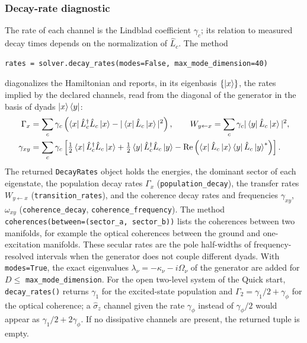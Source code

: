 \documentclass[11pt]{article}
\begin{document}
\subsubsection{Decay-rate diagnostic}

The rate of each channel is the Lindblad coefficient $\gamma_c$; its relation to measured decay times depends on the normalization of $\hat{L}_c$. The method
\begin{verbatim}
rates = solver.decay_rates(modes=False, max_mode_dimension=40)
\end{verbatim}
diagonalizes the Hamiltonian and reports, in its eigenbasis $\{\ket{x}\}$, the rates implied by the declared channels, read from the diagonal of the generator in the basis of dyads $\ket{x}\bra{y}$:
\begin{align}
    \Gamma_x&=\sum_c\gamma_c\left(\bra{x}\hat{L}_c^\dagger\hat{L}_c\ket{x}-|\bra{x}\hat{L}_c\ket{x}|^2\right),
    \qquad
    W_{y\leftarrow x}=\sum_c\gamma_c|\bra{y}\hat{L}_c\ket{x}|^2,\\
    \gamma_{xy}&=\sum_c\gamma_c\left[\tfrac{1}{2}\bra{x}\hat{L}_c^\dagger\hat{L}_c\ket{x}+\tfrac{1}{2}\bra{y}\hat{L}_c^\dagger\hat{L}_c\ket{y}-\operatorname{Re}\left(\bra{x}\hat{L}_c\ket{x}\bra{y}\hat{L}_c\ket{y}^*\right)\right].
\end{align}
The returned \texttt{DecayRates} object holds the energies, the dominant sector of each eigenstate, the population decay rates $\Gamma_x$ (\texttt{population\_decay}), the transfer rates $W_{y\leftarrow x}$ (\texttt{transition\_rates}), and the coherence decay rates and frequencies $\gamma_{xy}$, $\omega_{xy}$ (\texttt{coherence\_decay}, \texttt{coherence\_frequency}). The method \texttt{coherences(between=(sector\_a, sector\_b))} lists the coherences between two manifolds, for example the optical coherences between the ground and one-excitation manifolds. These secular rates are the pole half-widths of frequency-resolved intervals when the generator does not couple different dyads. With \texttt{modes=True}, the exact eigenvalues $\lambda_\nu=-\kappa_\nu-i\Omega_\nu$ of the generator are added for $D\leq$ \texttt{max\_mode\_dimension}. For the open two-level system of the Quick start, \texttt{decay\_rates()} returns $\gamma_1$ for the excited-state population and $\Gamma_2=\gamma_1/2+\gamma_\phi$ for the optical coherence; a $\hat{\sigma}_z$ channel given the rate $\gamma_\phi$ instead of $\gamma_\phi/2$ would appear as $\gamma_1/2+2\gamma_\phi$. If no dissipative channels are present, the returned tuple is empty.
\end{document}
